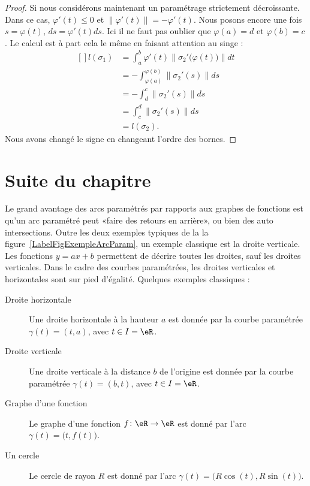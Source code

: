 \begin{proof}
	Si nous considérons maintenant un paramétrage strictement décroissante. Dans ce cas, \( \varphi'(t)\leq 0\) et \( \| \varphi'(t) \|=-\varphi'(t)\). Nous posons encore une fois \( s=\varphi(t)\), \( ds=\varphi'(t)ds\). Ici il ne faut pas oublier que \( \varphi(a)=d\) et \( \varphi(b)=c\). Le calcul est à part cela le même en faisant attention au singe :
	\begin{equation}
		\begin{aligned}[]
			l(\sigma_1) & =\int_a^b\varphi'(t)\| \sigma_2'\big( \varphi(t) \big) \|dt \\
			            & =-\int_{\varphi(a)}^{\varphi(b)}\| \sigma_2'(s) \|ds        \\
			            & =-\int_d^c\| \sigma_2'(s) \|ds                              \\
			            & =\int_c^d\| \sigma_2'(s) \|ds                               \\
			            & =l(\sigma_2).
		\end{aligned}
	\end{equation}
	Nous avons changé le signe en changeant l'ordre des bornes.
\end{proof}

\section{Suite du chapitre}

Le grand avantage des arcs paramétrés par rapports aux graphes de fonctions est qu'un arc paramétré peut «faire des retours en arrière», ou bien des auto intersections. Outre les deux exemples typiques de la la figure~\ref{LabelFigExempleArcParam}, un exemple classique est la droite verticale. Les fonctions \( y=ax+b\) permettent de décrire toutes les droites, sauf les droites verticales. Dans le cadre des courbes paramétrées, les droites verticales et horizontales sont sur pied d'égalité. Quelques exemples classiques :
\begin{description}
	\item[Droite horizontale] Une droite horizontale à la hauteur \( a\) est donnée par la courbe paramétrée \( \gamma(t)=(t,a)\), avec \( t\in I=\eR\).
	\item[Droite verticale] Une droite verticale à la distance \( b\) de l'origine est donnée par la courbe paramétrée \( \gamma(t)=(b,t)\), avec \( t\in I=\eR\).
		\item[Graphe d'une fonction]\label{PgGrqFnGamma} Le graphe d'une fonction \( f\colon \eR\to \eR\) est donné par l'arc \( \gamma(t)=\big( t,f(t) \big)\).
	\item[Un cercle] Le cercle de rayon \( R\) est donné par l'arc \( \gamma(t)=\big( R\cos(t),R\sin(t) \big)\).
\end{description}

